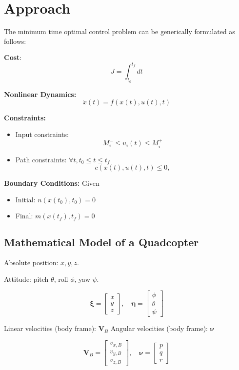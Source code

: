 
\section{Approach}
\label{sec:mathematical_formulation}

The minimum time optimal control problem can be generically formulated as follows:

\textbf{Cost}: $$J=\int_{t_{0}}^{t_{f}} d t$$

\textbf{Nonlinear Dynamics:} $$\dot{x}(t)= f(x(t), u(t), t)$$

\textbf{Constraints:} 
\begin{itemize}
  \item Input constraints:
    $$M_{i}^{-} \leq u_{i}(t) \leq M_{i}^{+}$$
  \item Path constraints:
  $\forall t, t_{0} \leq t \leq t_{f}$ 
  $$c(x(t), u(t), t) \leq 0,$$
\end{itemize}

\textbf{Boundary Conditions:}
Given 
\begin{itemize}
  \item Initial: $n(x(t_{0}), t_{0}) = 0$
  \item Final: $m(x(t_{f}), t_{f}) = 0$
\end{itemize}

\subsection{Mathematical Model of a Quadcopter}

Absolute position: $x, y, z$.

Attitude: pitch $\theta$, roll $\phi$, yaw $\psi$.

$$\boldsymbol{\xi}=\left[ \begin{array}{l}{x} \\ {y} \\ {z}\end{array}\right], \quad \boldsymbol{\eta}=\left[ \begin{array}{l}{\phi} \\ {\theta} \\ {\psi}\end{array}\right]$$

Linear velocities (body frame): $\boldsymbol{V}_{B}$
Angular velocities (body frame): $\boldsymbol{\nu}$

$$\boldsymbol{V}_{B}=\left[ \begin{array}{c}{v_{x, B}} \\ {v_{y, B}} \\ {v_{z, B}}\end{array}\right], \quad \boldsymbol{\nu}=\left[ \begin{array}{l}{p} \\ {q} \\ {r}\end{array}\right]$$

